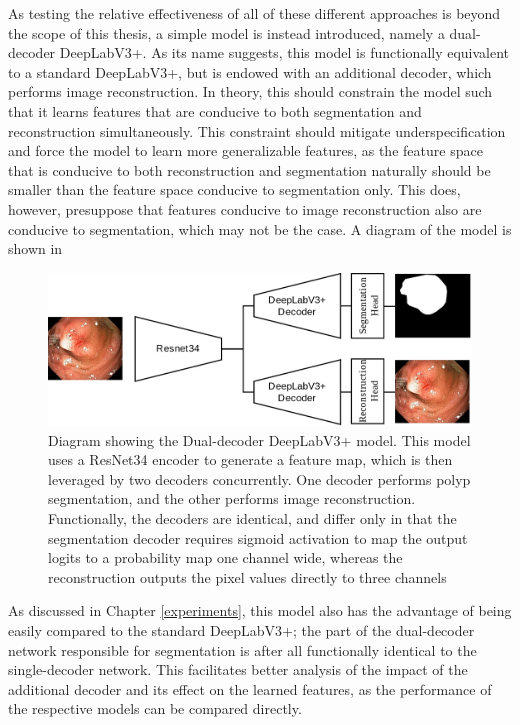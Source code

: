 As testing the relative effectiveness of all of these different approaches is beyond the scope of this thesis, a simple model is instead introduced, namely a dual-decoder DeepLabV3+. As its name suggests, this model is functionally equivalent to a standard DeepLabV3+, but is endowed with an additional decoder, which performs image reconstruction. In theory, this should constrain the model such that it learns features that are conducive to both segmentation and reconstruction simultaneously. This constraint should mitigate underspecification and force the model to learn more generalizable features, as the feature space that is conducive to both reconstruction and segmentation naturally should be smaller than the feature space conducive to segmentation only. This does, however, presuppose that features conducive to image reconstruction also are conducive to segmentation, which may not be the case. A diagram of the model is shown in 
\begin{figure}[ht]
    \centering
    \includegraphics[width=\linewidth]{illustrations/InductiveNet.drawio.png}
    \caption[Dual Decoder DeepLabV3]{Diagram showing the Dual-decoder DeepLabV3+ model. This model uses a ResNet34 encoder to generate a feature map, which is then leveraged by two decoders concurrently. One decoder performs polyp segmentation, and the other performs image reconstruction. Functionally, the decoders are identical, and differ only in that the segmentation decoder requires sigmoid activation to map the output logits to a probability map one channel wide, whereas the reconstruction outputs the pixel values directly to three channels}
    \label{fig:dddeeplabv3}
\end{figure}

As discussed in Chapter \ref{experiments}, this model also has the advantage of being easily compared to the standard DeepLabV3+; the part of the dual-decoder network responsible for segmentation is after all functionally identical to the single-decoder network. This facilitates better analysis of the impact of the additional decoder and its effect on the learned features, as the performance of the respective models can be compared directly. 

